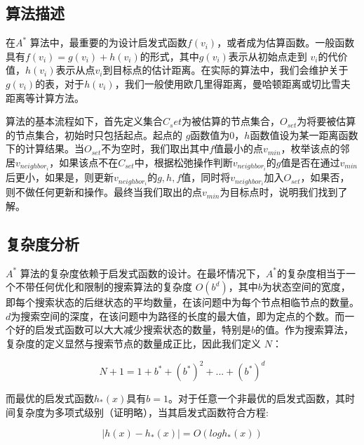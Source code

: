 \documentclass{standalone}
\begin{document}
\subsection{算法描述}
在$A^{*}$ 算法中，最重要的为设计启发式函数$f(v_i)$，或者成为估算函数。一般函数具有$f(v_i) = g(v_i) + h(v_i)$的形式，其中$g(v_i)$表示从初始点走到 $v_i$的代价值，$h(v_i)$表示从点$v_i$到目标点的估计距离。在实际的算法中，我们会维护关于$g(v_i)$的表，对于$h(v_i)$，我们一般使用欧几里得距离，曼哈顿距离或切比雪夫距离等计算方法。\par
算法的基本流程如下，首先定义集合$C_set$为被估算的节点集合，$O_{set}$为将要被估算的节点集合，初始时只包括起点。起点的 $g$函数值为0，$h$函数值设为某一距离函数下的计算结果。当$O_{set}$不为空时，我们取出其中$f$值最小的点$v_{min}$，枚举该点的邻居$v_{neighbor_i}$，如果该点不在$C_{set}$中，根据松弛操作判断$v_{neighbor_i}$的$g$值是否在通过$v_{min}$后更小，如果是，则更新$v_{neighbor_i}$的$g, h, f$值，同时将$v_{neighbor_i}$加入$O_{set}$，如果否，则不做任何更新和操作。最终当我们取出的点$v_{min}$为目标点时，说明我们找到了解。
\subsection{复杂度分析}
$A^{*}$ 算法的复杂度依赖于启发式函数的设计。在最坏情况下，$A^{*}$的复杂度相当于一个不带任何优化和限制的搜索算法的复杂度 $O(b^d)$，其中$b$为状态空间的宽度，即每个搜索状态的后继状态的平均数量，在该问题中为每个节点相临节点的数量。$d$为搜索空间的深度，在该问题中为路径的长度的最大值，即为定点的个数。而一个好的启发式函数可以大大减少搜索状态的数量，特别是$b$的值。作为搜索算法，复杂度的定义显然与搜索节点的数量成正比，因此我们定义 $N$： 
\begin{center}
    \begin{equation}
        N + 1 = 1 + b^* + (b^*)^2 + ... + (b^*)^d
    \end{equation}
\end{center}
而最优的启发式函数$h_*(x)$具有$b=1$。对于任意一个非最优的启发式函数，其时间复杂度为多项式级别（证明略），当其启发式函数符合方程:
\begin{center}
    \begin{equation}
        |h(x) - h_*(x)| = O(logh_*(x))
    \end{equation}
\end{center}
\end{document}
